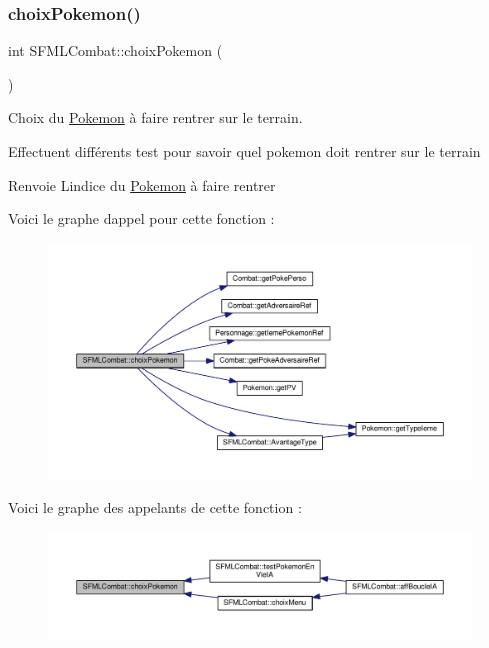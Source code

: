 \subsubsection{\texorpdfstring{choix\+Pokemon()}{choixPokemon()}}
{\footnotesize\ttfamily int S\+F\+M\+L\+Combat\+::choix\+Pokemon (\begin{DoxyParamCaption}{ }\end{DoxyParamCaption})\hspace{0.3cm}{\ttfamily [private]}}



Choix du \hyperlink{class_pokemon}{Pokemon} à faire rentrer sur le terrain. 

Effectuent différents test pour savoir quel pokemon doit rentrer sur le terrain \begin{DoxyReturn}{Renvoie}
L\textquotesingle{}indice du \hyperlink{class_pokemon}{Pokemon} à faire rentrer 
\end{DoxyReturn}
Voici le graphe d\textquotesingle{}appel pour cette fonction \+:\nopagebreak
\begin{figure}[H]
\begin{center}
\leavevmode
\includegraphics[width=350pt]{class_s_f_m_l_combat_a4d5b43087452661e39479026a886d1b6_cgraph}
\end{center}
\end{figure}
Voici le graphe des appelants de cette fonction \+:\nopagebreak
\begin{figure}[H]
\begin{center}
\leavevmode
\includegraphics[width=350pt]{class_s_f_m_l_combat_a4d5b43087452661e39479026a886d1b6_icgraph}
\end{center}
\end{figure}
\mbox{\label{class_s_f_m_l_combat_aea2c9616512a2cb0c5e7e2f676a5daab}} 
